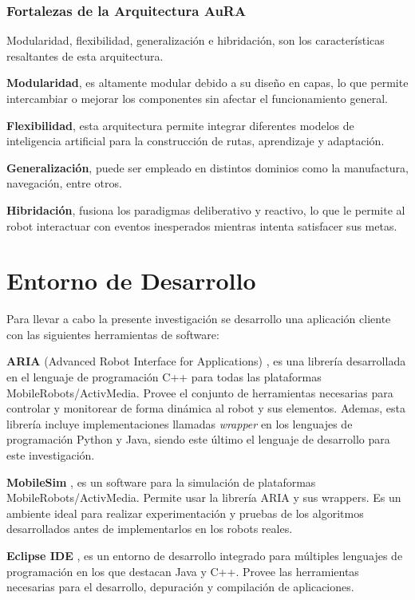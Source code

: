 \documentclass[11pt,twoside,A5]{article}
\begin{document}
\subsubsection*{Fortalezas de la Arquitectura AuRA}

Modularidad, flexibilidad, generalización e hibridación, son los características resaltantes de esta arquitectura.

\textbf{Modularidad}, es altamente modular debido a su diseño en capas, lo que permite intercambiar o mejorar
los componentes sin afectar el funcionamiento general.

\textbf{Flexibilidad}, esta arquitectura permite integrar diferentes modelos de inteligencia artificial 
para la construcción de rutas, aprendizaje y adaptación. 

\textbf{Generalización}, puede ser empleado en distintos dominios como la manufactura, navegación, entre otros.

\textbf{Hibridación}, fusiona los paradigmas deliberativo y reactivo, lo que le permite al robot interactuar con eventos inesperados mientras intenta satisfacer sus metas.

\section*{Entorno de Desarrollo}

Para llevar a cabo la presente investigación se desarrollo una aplicación cliente
con las siguientes herramientas de software:

\textbf{ARIA} (Advanced Robot Interface for Applications) \cite{aria2014},
es una librería desarrollada en el lenguaje de programación C++ para todas las
plataformas MobileRobots/ActivMedia. Provee el conjunto de herramientas necesarias
para controlar y monitorear de forma dinámica al robot y sus elementos. Ademas, esta librería
incluye implementaciones llamadas \textit{wrapper} en los lenguajes de programación Python y Java, siendo este último 
el lenguaje de desarrollo para este investigación.

\textbf{MobileSim} \cite{mobilesim2014}, es un software para la simulación de plataformas
MobileRobots/ActivMedia. Permite usar la librería ARIA y sus wrappers. Es un ambiente
ideal para realizar experimentación y pruebas de los algoritmos desarrollados antes de
implementarlos en los robots reales.
 
\textbf{Eclipse IDE} \cite{eclipse2014}, es un entorno de desarrollo integrado para múltiples lenguajes de 
programación en los que destacan Java y C++. Provee las herramientas necesarias para el desarrollo, depuración  
y compilación de aplicaciones.
\end{document}
